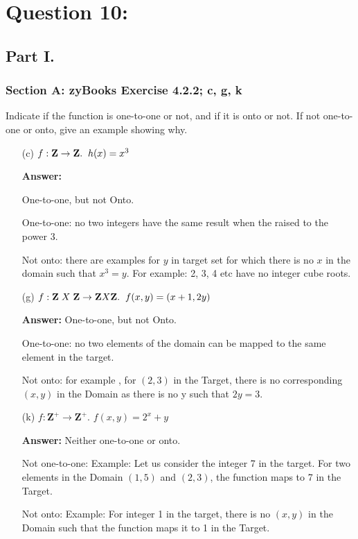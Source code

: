 \documentclass[14pt]{extreport}
\newcommand{\answer}[0]{\medskip \textbf{Answer:} \medskip}
\begin{document}
\section*{Question 10:}

\subsection*{Part I.}

\subsubsection*{Section A: zyBooks Exercise 4.2.2; c, g, k}
    
Indicate if the function is one-to-one or not, and if it is onto or not. If not one-to-one or onto, give an example showing why. 

\begin{enumerate}
    \item[(c)] $f: \textbf{Z} \to \textbf{Z}. \hspace{2mm} h(x) = x^{3}$
    
        \answer

            One-to-one, but not Onto.
            
            One-to-one: no two integers have the same result when the raised to the power 3. 
            
            Not onto: there are examples for $y$ in target set for which there is no $x$ in the domain such that $x^{3} = y$. For example: 2, 3, 4 etc have no integer cube roots.
    \newline
    \item[(g)] $f: \textbf{Z}\hspace{1mm} X \hspace{1mm}\textbf{Z} \to \textbf{Z} X \textbf{Z}. \hspace{2mm} f(x,y) = (x+1, 2y)$
    
        \answer
        One-to-one, but not Onto. 
        
        One-to-one: no two elements of the domain can be mapped to the same element in the target. 
        
        Not onto: for example , for $\left(2,3\right)$ in the Target, there is no corresponding $\left(x,y\right)$ in the Domain as there is no y such that $2y = 3$. 
    \newline
    
    \item[(k)] $f: \textbf{Z} ^{+} \to \textbf{Z} ^{+}$.\hspace{1mm} $f(x,y) = 2^{x} + y$
    
        \answer
        Neither one-to-one or onto. 
        
        Not one-to-one: Example: Let us consider the integer 7 in the target. For two elements in the Domain $\left(1,5\right)$ and $\left(2,3\right)$, the function maps to 7 in the Target. 
        
        Not onto: Example: For integer 1 in the target, there is no $\left(x,y\right)$ in the Domain such that the function maps it to 1 in the Target. 

\end{enumerate}
\end{document}
